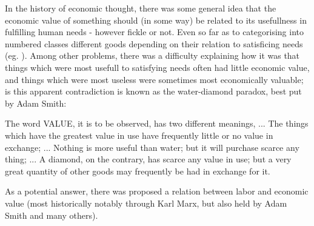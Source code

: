 In the history of economic thought, there was some general idea that the economic value of something should (in some way) be related to its usefullness in fulfilling human needs - however fickle or not.
Even so far as to categorising into numbered classes different goods depending on their relation to satisficing needs (eg. \cite[Chapter 1]{mengerprinciples}).
Among other problems, there was a difficulty explaining how it was that things which were most usefull to satisfying needs often had little economic value, and things which were most useless were sometimes most economically valuable; is this apparent contradiction is known as the water-diamond paradox, best put by Adam Smith:


\begin{displayquote}
The word VALUE, it is to be observed, has two different meanings, ... The things which have the greatest value in use have frequently little or no value in exchange; ... Nothing is more useful than water; but it will purchase scarce any thing; ... A diamond, on the contrary, has scarce any value in use; but a very great quantity of other goods may frequently be had in exchange for it.\cite{Smith1Gutenberg}
\end{displayquote}

As a potential answer, there was proposed a relation between labor and economic value (most historically notably through Karl Marx, but also held by Adam Smith and many others).


